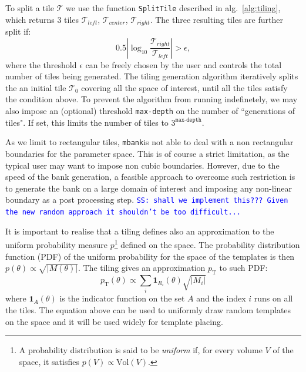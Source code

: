 \documentclass[twocolumn,showpacs,preprintnumbers,nofootinbib,prd,
superscriptaddress,10pt]{revtex4-2}
\newcommand{\mbank}{\texttt{mbank}}
\newcommand{\stefano}[1]{{\textcolor{blue}{\texttt{SS: #1}} }}
\begin{document}
To split a tile $\mathcal{T}$ we use the function \texttt{SplitTile} described in alg.~\ref{alg:tiling}, which returns 3 tiles $\mathcal{T}_{left}$, $\mathcal{T}_{center}$, $\mathcal{T}_{right}$.
The three resulting tiles are further split if:
\begin{equation}
	0.5\left|\log_{\textrm{10}}\frac{\mathcal{T}_{right}}{\mathcal{T}_{left}}\right| > \epsilon,
\end{equation}
where the threshold $\epsilon$ can be freely chosen by the user and controls the total number of tiles being generated.
The tiling generation algorithm iteratively splits the an initial tile $\mathcal{T}_{0}$ covering all the space of interest, until all the tiles satisfy the condition above.
To prevent the algorithm from running indefinetely, we may also impose an (optional) threshold \texttt{max-depth} on the number of ``generations of tiles". If set, this limits the number of tiles to $3^{\texttt{max-depth}}$.

As we limit to rectangular tiles, \mbank is not able to deal with a non rectangular boundaries for the parameter space. This is of course a strict limitation, as the typical user may want to impose non cubic boundaries. However, due to the speed of the bank generation, a feasible approach to overcome such restriction is to generate the bank on a large domain of interest and imposing any non-linear boundary as a post processing step. \stefano{shall we implement this??? Given the new random approach it shouldn't be too difficult...}

It is important to realise that a tiling defines also an approximation to the uniform probability measure $p$\footnote{
A probability distribution is said to be {\it uniform} if, for every volume $V$ of the space, it satisfies $p(V) \propto \text{Vol}(V)$.}
defined on the space.
The probability distribution function (PDF) of the uniform probability for the space of the templates is then $p(\theta) \propto \sqrt{|M(\theta)|}$.
The tiling gives an approximation $p_{\text{T}}$ to such PDF:
\begin{equation}\label{eq:tiling_pdf}
	p_{\text{T}}(\theta) \propto \sum_i \mathbf{1}_{R_i}(\theta) \sqrt{|M_i|}
\end{equation}
where $\mathbf{1}_A(\theta)$ is the indicator function on the set $A$ and the index $i$ runs on all the tiles.
The equation above can be used to uniformly draw random templates on the space and it will be used widely for template placing.
\end{document}
